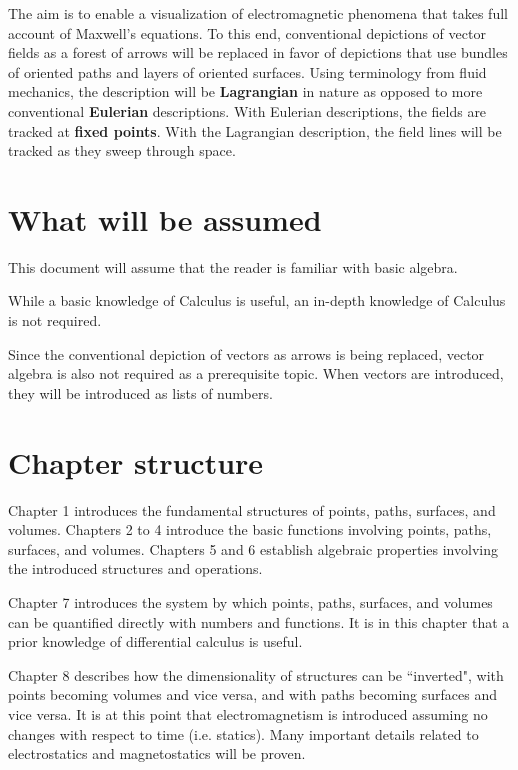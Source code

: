 \documentclass{book}
\begin{document}
The aim is to enable a visualization of electromagnetic phenomena that takes full account of Maxwell's equations. To this end, conventional depictions of vector fields as a forest of arrows will be replaced in favor of depictions that use bundles of oriented paths and layers of oriented surfaces. Using terminology from fluid mechanics, the description will be {\bf Lagrangian} in nature as opposed to more conventional {\bf Eulerian} descriptions. With Eulerian descriptions, the fields are tracked at {\bf fixed points}. With the Lagrangian description, the field lines will be tracked as they sweep through space. 

\section*{What will be assumed}

This document will assume that the reader is familiar with basic algebra. 

While a basic knowledge of Calculus is useful, an in-depth knowledge of Calculus is not required. 

Since the conventional depiction of vectors as arrows is being replaced, vector algebra is also not required as a prerequisite topic. When vectors are introduced, they will be introduced as lists of numbers.

\section*{Chapter structure}

Chapter 1 introduces the fundamental structures of points, paths, surfaces, and volumes. Chapters 2 to 4 introduce the basic functions involving points, paths, surfaces, and volumes. Chapters 5 and 6 establish algebraic properties involving the introduced structures and operations. 

Chapter 7 introduces the system by which points, paths, surfaces, and volumes can be quantified directly with numbers and functions. It is in this chapter that a prior knowledge of differential calculus is useful. 

Chapter 8 describes how the dimensionality of structures can be ``inverted", with points becoming volumes and vice versa, and with paths becoming surfaces and vice versa. It is at this point that electromagnetism is introduced assuming no changes with respect to time (i.e. statics). Many important details related to electrostatics and magnetostatics will be proven. 
\end{document}
